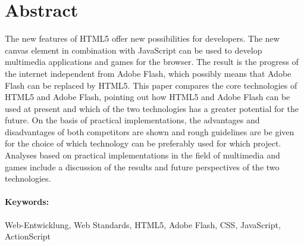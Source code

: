 \section*{Abstract}\thispagestyle{empty}
The new features of HTML5 offer new possibilities for developers. The new
canvas element in combination with JavaScript can be used to develop
multimedia applications and games for the browser. The result is the
progress of the internet independent from Adobe Flash, which possibly means
that Adobe Flash can be replaced by HTML5.
\newline\newline
This paper compares the core technologies of HTML5 and
Adobe Flash, pointing out how HTML5 and Adobe Flash can
be used at present and which of the two technologies has a greater potential
for the future. On the basis of practical implementations, the advantages and
disadvantages of both competitors are shown and rough guidelines are be
given for the choice of which technology can be preferably used for which
project.
\newline\newline
Analyses based on practical implementations in the field of multimedia and
games include a discussion of the results and future perspectives of the two
technologies.
\\ \vfill
\paragraph*{Keywords:} Web-Entwicklung, Web Standards, HTML5,
Adobe Flash, CSS, JavaScript, ActionScript
